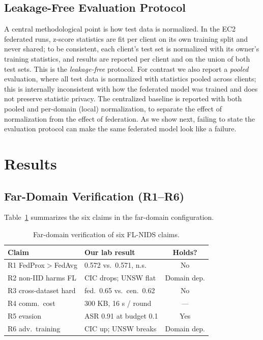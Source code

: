 \documentclass[conference,onecolumn]{IEEEtran}
\begin{document}
\subsection{Leakage-Free Evaluation Protocol}
A central methodological point is how test data is normalized. In the EC2 federated runs, z-score
statistics are fit per client on its own training split and never shared; to be consistent, each
client's test set is normalized with its owner's training statistics, and results are reported per
client and on the union of both test sets. This is the \emph{leakage-free} protocol. For contrast we
also report a \emph{pooled} evaluation, where all test data is normalized with statistics pooled
across clients; this is internally inconsistent with how the federated model was trained and does not
preserve statistic privacy. The centralized baseline is reported with both pooled and per-domain
(local) normalization, to separate the effect of normalization from the effect of federation. As we
show next, failing to state the evaluation protocol can make the same federated model look like a
failure.

\section{Results}
\label{sec:results}

\subsection{Far-Domain Verification (R1--R6)}
Table~\ref{tab:results} summarizes the six claims in the far-domain configuration.

\begin{table}[htbp]
\caption{Far-domain verification of six FL-NIDS claims.}
\label{tab:results}
\begin{center}
\footnotesize
\begin{tabular}{|l|l|c|}
\hline
\textbf{Claim} & \textbf{Our lab result} & \textbf{Holds?} \\
\hline
R1 FedProx$>$FedAvg & 0.572 vs.\ 0.571, n.s. & No \\
R2 non-IID harms FL & CIC drops; UNSW flat & Domain dep. \\
R3 cross-dataset hard & fed.\ 0.65 vs.\ cen.\ 0.62 & No \\
R4 comm.\ cost & 300 KB, 16 s / round & --- \\
R5 evasion & ASR 0.91 at budget 0.1 & Yes \\
R6 adv.\ training & CIC up; UNSW breaks & Domain dep. \\
\hline
\end{tabular}
\end{center}
\end{table}
\end{document}
